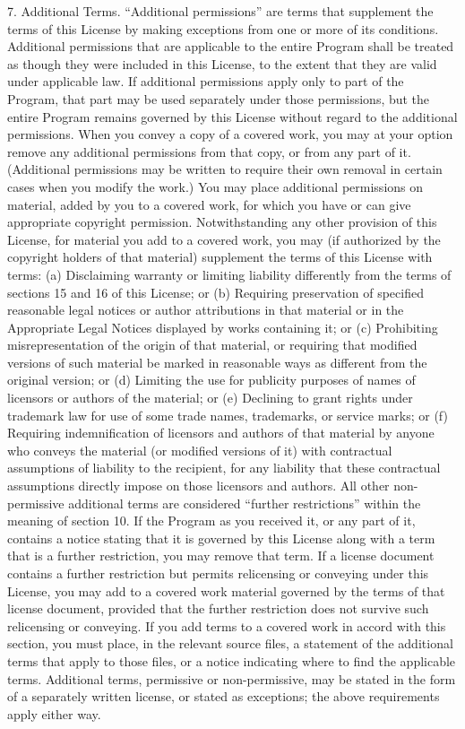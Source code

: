 \documentclass {book}
\begin{document}
\begin{tiny}
7. Additional Terms. ``Additional permissions'' are terms that supplement the terms of this License by making exceptions from one or more of its conditions. Additional permissions that are applicable to the entire Program shall be treated as though they were included in this License, to the extent that they are valid under applicable law. If additional permissions apply only to part of the Program, that part may be used separately under those permissions, but the entire Program remains governed by this License without regard to the additional permissions. When you convey a copy of a covered work, you may at your option remove any additional permissions from that copy, or from any part of it. (Additional permissions may be written to require their own removal in certain cases when you modify the work.) You may place additional permissions on material, added by you to a covered work, for which you have or can give appropriate copyright permission. Notwithstanding any other provision of this License, for material you add to a covered work, you may (if authorized by the copyright holders of that material) supplement the terms of this License with terms: (a) Disclaiming warranty or limiting liability differently from the terms of sections 15 and 16 of this License; or (b) Requiring preservation of specified reasonable legal notices or author attributions in that material or in the Appropriate Legal Notices displayed by works containing it; or (c) Prohibiting misrepresentation of the origin of that material, or requiring that modified versions of such material be marked in reasonable ways as different from the original version; or (d) Limiting the use for publicity purposes of names of licensors or authors of the material; or (e) Declining to grant rights under trademark law for use of some trade names, trademarks, or service marks; or (f) Requiring indemnification of licensors and authors of that material by anyone who conveys the material (or modified versions of it) with contractual assumptions of liability to the recipient, for any liability that these contractual assumptions directly impose on those licensors and authors. All other non-permissive additional terms are considered ``further restrictions'' within the meaning of section 10. If the Program as you received it, or any part of it, contains a notice stating that it is governed by this License along with a term that is a further restriction, you may remove that term. If a license document contains a further restriction but permits relicensing or conveying under this License, you may add to a covered work material governed by the terms of that license document, provided that the further restriction does not survive such relicensing or conveying. If you add terms to a covered work in accord with this section, you must place, in the relevant source files, a statement of the additional terms that apply to those files, or a notice indicating where to find the applicable terms. Additional terms, permissive or non-permissive, may be stated in the form of a separately written license, or stated as exceptions; the above requirements apply either way.


\end{tiny}
\end{document}

